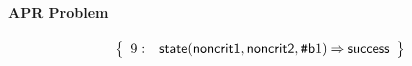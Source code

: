 \documentclass[a4paper]{article}
\newcommand{\ttsym}[1]{\mbox{\tt #1}}
\def\ttsharp{\ttsym{\symbol{35}}}
\newcommand{\symb}[1]{\mathsf{#1}}
\newcommand{\bv}[2][b]{{\ttsharp\symb{#1}{#2}}}
\begin{document}
\paragraph{APR Problem}

\[
\left\{
\begin{array}{rr@{\>}c@{\>}ll}
\mathrm{9} : 
 & \symb{state}(\symb{noncrit1},\symb{noncrit2},\bv{1})
 & \Rightarrow 
 & \symb{success}\\

\end{array}
\right\}
\]
\end{document}
